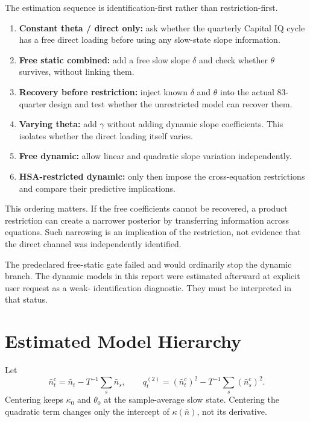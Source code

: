 \documentclass[11pt]{article}
\newcommand{\Nbar}{\bar n}
\begin{document}
The estimation sequence is identification-first rather than restriction-first.

\begin{enumerate}
\item \textbf{Constant theta / direct only:} ask whether the quarterly Capital IQ cycle has
a free direct loading before using any slow-state slope information.
\item \textbf{Free static combined:} add a free slow slope $\delta$ and check whether
$\theta$ survives, without linking them.
\item \textbf{Recovery before restriction:} inject known $\delta$ and $\theta$ into the
actual 83-quarter design and test whether the unrestricted model can recover them.
\item \textbf{Varying theta:} add $\gamma$ without adding dynamic slope coefficients. This
isolates whether the direct loading itself varies.
\item \textbf{Free dynamic:} allow linear and quadratic slope variation independently.
\item \textbf{HSA-restricted dynamic:} only then impose the cross-equation restrictions and
compare their predictive implications.
\end{enumerate}

This ordering matters. If the free coefficients cannot be recovered, a product restriction
can create a narrower posterior by transferring information across equations. Such narrowing
is an implication of the restriction, not evidence that the direct channel was independently
identified.

The predeclared free-static gate failed and would ordinarily stop the dynamic branch. The
dynamic models in this report were estimated afterward at explicit user request as a weak-
identification diagnostic. They must be interpreted in that status.

\section{Estimated Model Hierarchy}

Let
\begin{equation}
\Nbar_t^c=\Nbar_t-T^{-1}\sum_s\Nbar_s,
\qquad
q_t^{(2)}=(\Nbar_t^c)^2-T^{-1}\sum_s(\Nbar_s^c)^2.
\end{equation}
Centering keeps $\kappa_0$ and $\theta_0$ at the sample-average slow state. Centering the
quadratic term changes only the intercept of $\kappa(\Nbar)$, not its derivative.
\end{document}
